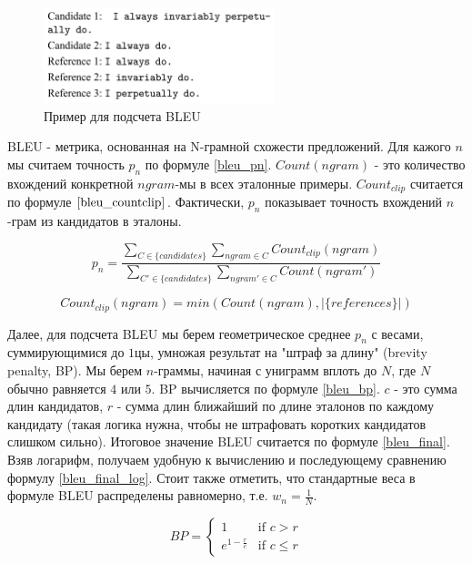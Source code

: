 \documentclass{spbau-diploma}
\begin{document}
\begin{figure}
\centering
\includegraphics[width=0.6\textwidth]{images/bleu_example.png}
\caption{Пример для подсчета BLEU}
\label{bleu_example}
\end{figure}

BLEU - метрика, основанная на N-грамной схожести предложений. Для кажого $n$
мы считаем точность $p_n$ по формуле \ref{bleu_pn}. $Count(ngram)$ - это 
количество вхождений конкретной $ngram$-мы в всех эталонные примеры. 
$Count_{clip}$ считается по формуле $\ref{bleu_countclip}$. Фактически, $p_n$
показывает точность вхождений $n$-грам из кандидатов в эталоны.

\begin{equation}
\label{bleu_pn}
p_n = \frac{\sum\limits_{C \in \{candidates\}}{\sum\limits_{ngram \in C}{Count_{clip}(ngram)}}}{\sum\limits_{C' \in \{candidates\}}{\sum\limits_{ngram' \in C}{Count(ngram')}}}
\end{equation}

\begin{equation}
\label{bleu_countclip}
Count_{clip}(ngram) = min(Count(ngram), |\{references\}|)
\end{equation}

Далее, для подсчета BLEU мы берем геометрическое среднее $p_n$ с весами, 
суммирующимися до $1$цы, умножая результат на "штраф за длину" 
(brevity penalty, BP). Мы берем $n$-граммы, начиная с униграмм вплоть до $N$, 
где $N$ обычно равняется $4$ или $5$. BP вычисляется по формуле \ref{bleu_bp}. 
$c$ - это сумма длин кандидатов, $r$ - сумма длин ближайший по длине эталонов 
по каждому кандидату (такая логика нужна, чтобы не штрафовать коротких 
кандидатов слишком сильно). Итоговое значение BLEU считается по формуле 
\ref{bleu_final}. Взяв логарифм, получаем удобную к вычислению и последующему
сравнению формулу \ref{bleu_final_log}. Стоит также отметить, что стандартные 
веса в формуле BLEU распределены равномерно, т.е. $w_n = \frac{1}{N}$.

\begin{equation}
\label{bleu_bp}
BP = 
\begin{cases}
1 &\text{if } c > r\\
e^{1 - \frac{r}{c}} &\text{if } c \leqslant r
\end{cases}
\end{equation}
\end{document}
